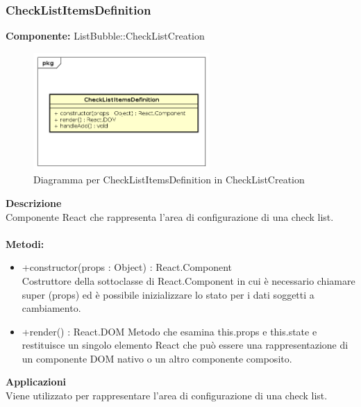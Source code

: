 \subsubsection{CheckListItemsDefinition}
\textbf{Componente:}  ListBubble::CheckListCreation\\
   \FloatBarrier
   \begin{figure}[ht]
   \centering
   \includegraphics[width=0.6\textwidth]{img/single-CheckListItemsDefinition}
   \caption{{Diagramma per CheckListItemsDefinition in CheckListCreation}}
\end{figure}
\FloatBarrier
\textbf{Descrizione}\\
Componente React che rappresenta l'area di configurazione di una check list.
\\
\\
\textbf{Metodi:} 
\begin{itemize}
\item +constructor(props : Object) : React.Component 
\\
Costruttore della sottoclasse di React.Component in cui è necessario chiamare super (props) ed è possibile inizializzare lo stato per i dati soggetti a cambiamento.

\item +render() : React.DOM
Metodo che esamina this.props e this.state e restituisce un singolo elemento React che può essere una rappresentazione di un componente DOM nativo o un altro componente composito.

\end{itemize} 


\textbf{Applicazioni}\\
Viene utilizzato per rappresentare l'area di configurazione di una check list. 


\clearpage

